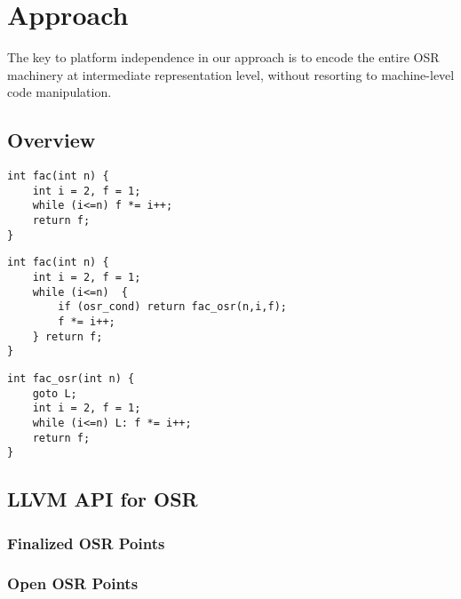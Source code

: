 \section{Approach}
\label{se:approach}

The key to platform independence in our approach is to encode the entire OSR machinery at intermediate representation level, without resorting to machine-level code manipulation.

\subsection{Overview}

\begin{verbatim}
int fac(int n) {
    int i = 2, f = 1;
    while (i<=n) f *= i++;
    return f;
}
\end{verbatim}

\begin{verbatim}
int fac(int n) {
    int i = 2, f = 1;
    while (i<=n)  {
        if (osr_cond) return fac_osr(n,i,f); 
        f *= i++; 
    } return f;
}
\end{verbatim}

\begin{verbatim}
int fac_osr(int n) {
    goto L;
    int i = 2, f = 1;
    while (i<=n) L: f *= i++;
    return f;
}
\end{verbatim}

\subsection{LLVM API for OSR}

\subsubsection{Finalized OSR Points}

\subsubsection{Open OSR Points}


  
  
  
  
  
  
  
  
  
  
  
  